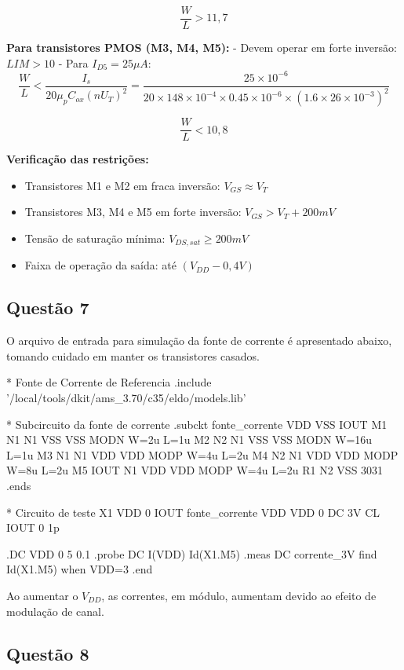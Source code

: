 \documentclass[12pt,a4paper]{article}
\begin{document}
$$\frac{W}{L} > 11,7$$

\textbf{Para transistores PMOS (M3, M4, M5):}
- Devem operar em forte inversão: $LIM > 10$
- Para $I_{D5} = 25\mu A$:
$$\frac{W}{L} < \frac{I_s}{20\mu_p C_{ox} (nU_T)^2} = \frac{25 \times 10^{-6}}{20 \times 148 \times 10^{-4} \times 0.45 \times 10^{-6} \times (1.6 \times 26 \times 10^{-3})^2}$$

$$\frac{W}{L} < 10,8$$

\textbf{Verificação das restrições:}
\begin{itemize}
    \item Transistores M1 e M2 em fraca inversão: $V_{GS} \approx V_T$
    \item Transistores M3, M4 e M5 em forte inversão: $V_{GS} > V_T + 200mV$
    \item Tensão de saturação mínima: $V_{DS,sat} \geq 200mV$
    \item Faixa de operação da saída: até $(V_{DD} - 0,4V)$
\end{itemize}

\subsection*{Questão 7}

O arquivo de entrada para simulação da fonte de corrente é apresentado abaixo, tomando cuidado em manter os transistores casados.

\begin{codeblock}[title={Arquivo de simulação da fonte de corrente}]
* Fonte de Corrente de Referencia
.include '/local/tools/dkit/ams_3.70/c35/eldo/models.lib'

* Subcircuito da fonte de corrente
.subckt fonte_corrente VDD VSS IOUT
M1 N1 N1 VSS VSS MODN W=2u L=1u
M2 N2 N1 VSS VSS MODN W=16u L=1u
M3 N1 N1 VDD VDD MODP W=4u L=2u
M4 N2 N1 VDD VDD MODP W=8u L=2u
M5 IOUT N1 VDD VDD MODP W=4u L=2u
R1 N2 VSS 3031
.ends

* Circuito de teste
X1 VDD 0 IOUT fonte_corrente
VDD VDD 0 DC 3V
CL IOUT 0 1p

.DC VDD 0 5 0.1
.probe DC I(VDD) Id(X1.M5)
.meas DC corrente_3V find Id(X1.M5) when VDD=3
.end
\end{codeblock}

Ao aumentar o $V_{DD}$, as correntes, em módulo, aumentam devido ao efeito de modulação de canal.

\subsection*{Questão 8}
\end{document}
